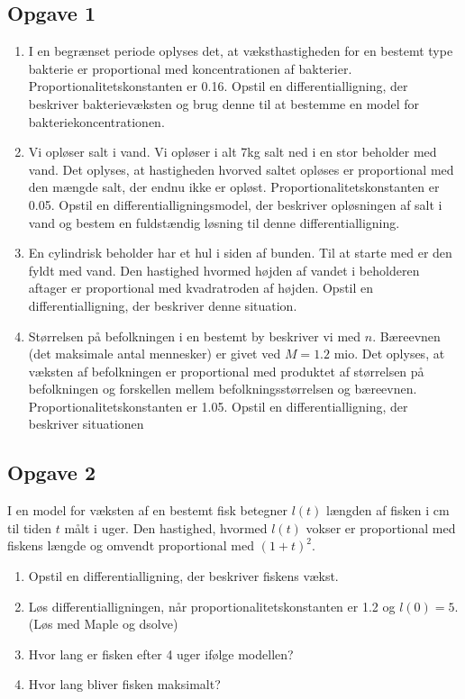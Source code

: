 \subsection*{Opgave 1}
\begin{enumerate}[label=\roman*)]
	\item I en begrænset periode oplyses det, at væksthastigheden for en bestemt type bakterie er proportional med koncentrationen af bakterier. Proportionalitetskonstanten er 0.16. Opstil en 
	differentialligning, der beskriver bakterievæksten og brug denne til at bestemme en model for bakteriekoncentrationen. 
	\item Vi opløser salt i vand. Vi opløser i alt 7kg salt ned i en stor beholder med vand. Det oplyses, at hastigheden hvorved saltet opløses er proportional med den mængde salt, der endnu ikke er 
	opløst. Proportionalitetskonstanten er 0.05. Opstil en differentialligningsmodel, der beskriver opløsningen af salt i vand og bestem en fuldstændig løsning til denne differentialligning. 
	\item En cylindrisk beholder har et hul i siden af bunden. Til at starte med er den fyldt med vand. Den hastighed hvormed højden af vandet i beholderen aftager er proportional med kvadratroden af 
	højden. Opstil en differentialligning, der beskriver denne situation.
	\item Størrelsen på befolkningen i en bestemt by beskriver vi med $n$. Bæreevnen (det maksimale antal mennesker) er givet ved $M = 1.2$ mio. Det oplyses, at væksten af befolkningen er proportional 
	med produktet af størrelsen på befolkningen og forskellen mellem befolkningsstørrelsen og bæreevnen. Proportionalitetskonstanten er 1.05. Opstil en differentialligning, der beskriver situationen
\end{enumerate}

\subsection*{Opgave 2}

I en model for væksten af en bestemt fisk betegner $l(t)$ længden af fisken i cm til tiden $t$ målt i uger. Den hastighed, hvormed $l(t)$ vokser er proportional med fiskens længde og omvendt proportional med $(1+t)^2.$

\begin{enumerate}[label=\roman*)]
	\item Opstil en differentialligning, der beskriver fiskens vækst. 
	\item Løs differentialligningen, når proportionalitetskonstanten er 1.2 og $l(0) = 5$. (Løs med Maple og dsolve)
	\item Hvor lang er fisken efter 4 uger ifølge modellen?
	\item Hvor lang bliver fisken maksimalt?
\end{enumerate}




